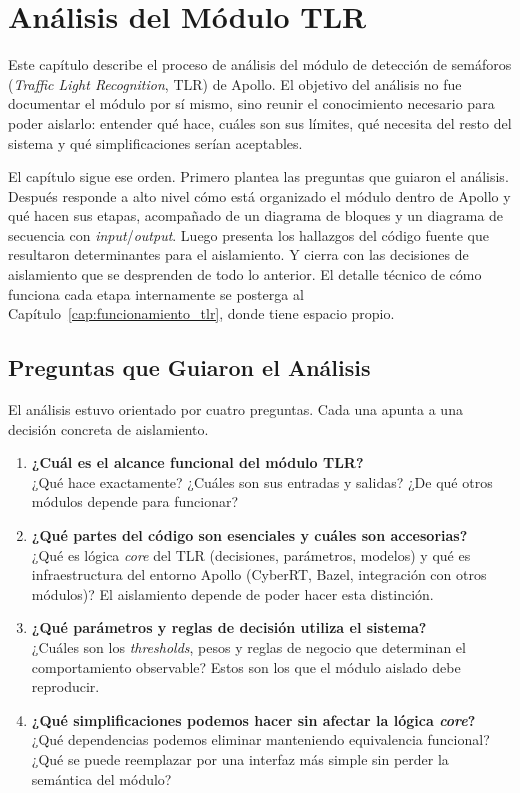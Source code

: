 \chapter{Análisis del Módulo TLR}
\label{cap:analisis_apollo}

Este capítulo describe el proceso de análisis del módulo de detección de semáforos (\textit{Traffic Light Recognition}, TLR) de Apollo. El objetivo del análisis no fue documentar el módulo por sí mismo, sino reunir el conocimiento necesario para poder aislarlo: entender qué hace, cuáles son sus límites, qué necesita del resto del sistema y qué simplificaciones serían aceptables.

El capítulo sigue ese orden. Primero plantea las preguntas que guiaron el análisis. Después responde a alto nivel cómo está organizado el módulo dentro de Apollo y qué hacen sus etapas, acompañado de un diagrama de bloques y un diagrama de secuencia con \textit{input}/\textit{output}. Luego presenta los hallazgos del código fuente que resultaron determinantes para el aislamiento. Y cierra con las decisiones de aislamiento que se desprenden de todo lo anterior. El detalle técnico de cómo funciona cada etapa internamente se posterga al Capítulo~\ref{cap:funcionamiento_tlr}, donde tiene espacio propio.

\section{Preguntas que Guiaron el Análisis}
\label{sec:preguntas_analisis}

El análisis estuvo orientado por cuatro preguntas. Cada una apunta a una decisión concreta de aislamiento.

\begin{enumerate}
    \item \textbf{¿Cuál es el alcance funcional del módulo TLR?} \\
    ¿Qué hace exactamente? ¿Cuáles son sus entradas y salidas? ¿De qué otros módulos depende para funcionar?

    \item \textbf{¿Qué partes del código son esenciales y cuáles son accesorias?} \\
    ¿Qué es lógica \textit{core} del TLR (decisiones, parámetros, modelos) y qué es infraestructura del entorno Apollo (CyberRT, Bazel, integración con otros módulos)? El aislamiento depende de poder hacer esta distinción.

    \item \textbf{¿Qué parámetros y reglas de decisión utiliza el sistema?} \\
    ¿Cuáles son los \textit{thresholds}, pesos y reglas de negocio que determinan el comportamiento observable? Estos son los que el módulo aislado debe reproducir.

    \item \textbf{¿Qué simplificaciones podemos hacer sin afectar la lógica \textit{core}?} \\
    ¿Qué dependencias podemos eliminar manteniendo equivalencia funcional? ¿Qué se puede reemplazar por una interfaz más simple sin perder la semántica del módulo?
\end{enumerate}

